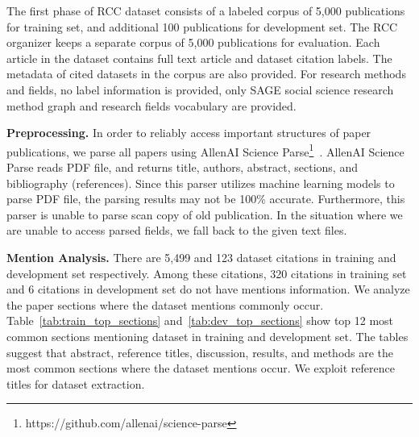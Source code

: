 The first phase of RCC dataset consists of a labeled corpus of 5,000 publications for training set, and additional 100 publications for development set. The RCC organizer keeps a separate corpus of 5,000 publications for evaluation. Each article in the dataset contains full text article and dataset citation labels. The metadata of cited datasets in the corpus are also provided. For research methods and fields, no label information is provided, only SAGE social science research method graph and research fields vocabulary are provided.

\textbf{Preprocessing.} In order to reliably access important structures of paper publications, we parse all papers using AllenAI Science Parse\footnote{https://github.com/allenai/science-parse}~\citep{Ammar2018ConstructionOT}. AllenAI Science Parse reads PDF file, and returns title, authors, abstract, sections, and bibliography (references). Since this parser utilizes machine learning models to parse PDF file, the parsing results may not be 100\% accurate. Furthermore, this parser is unable to parse scan copy of old publication. In the situation where we are unable to access parsed fields, we fall back to the given text files.


\textbf{Mention Analysis.} There are 5,499 and 123 dataset citations in training and development set respectively. Among these citations, 320 citations in training set and 6 citations in development set do not have mentions information. We analyze the paper sections where the dataset mentions commonly occur. Table~\ref{tab:train_top_sections} and~\ref{tab:dev_top_sections} show top 12 most common sections mentioning dataset in training and development set. The tables suggest that abstract, reference titles, discussion, results, and methods are the most common sections where the dataset mentions occur. We exploit reference titles for dataset extraction.

